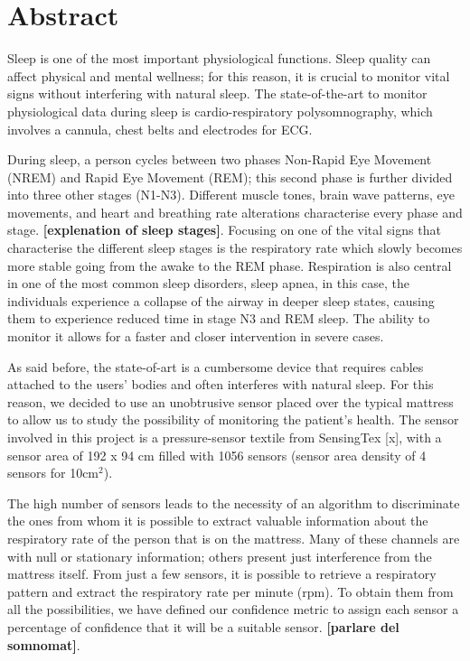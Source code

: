 \chapter*{Abstract}
Sleep is one of the most important physiological functions. Sleep quality can affect physical and mental wellness; for this reason,
 it is crucial to monitor vital signs without interfering with natural sleep. 
 The state-of-the-art to monitor physiological data during sleep is cardio-respiratory polysomnography, which involves a cannula, chest belts and electrodes for ECG.

 During sleep, a person cycles between two phases Non-Rapid Eye Movement (NREM) and Rapid Eye Movement (REM); this second phase is further divided into three other stages (N1-N3). Different muscle tones, brain wave patterns, eye movements, and heart and breathing rate alterations characterise every phase and stage.
\textbf{[explenation of sleep stages]}.
Focusing on one of the vital signs that characterise the different sleep stages is the respiratory rate which slowly becomes more stable going from the awake to the REM phase. Respiration is also central in one of the most common sleep disorders, sleep apnea, in this case, the individuals experience a collapse of the airway in deeper sleep states, causing them to experience reduced time in stage N3 and REM sleep. 
The ability to monitor it allows for a faster and closer intervention in severe cases. 

As said before, the state-of-art is a cumbersome device that 
requires cables attached to the users' bodies and often interferes with 
natural sleep. For this reason, we decided to use an unobtrusive sensor 
placed over the typical mattress to allow us to study the possibility of
 monitoring the patient's health. The sensor involved in this project is a 
 pressure-sensor textile from SensingTex [x], with a sensor area of 192 x 94 
 cm filled with 1056 sensors (sensor area density of 4 sensors for 10cm$^2$).

 The high number of sensors leads to the necessity of an algorithm to discriminate the ones from whom it is possible to extract valuable information about the respiratory rate of the person that is on the mattress.
 Many of these channels are with null or stationary information; others present just interference from the mattress itself. From just a few sensors, it is possible to retrieve a respiratory pattern and extract the respiratory rate per minute (rpm). To obtain them from all the possibilities, we have defined our confidence metric to assign each sensor a percentage of confidence that it will be a suitable sensor.
 \textbf{[parlare del somnomat]}.

